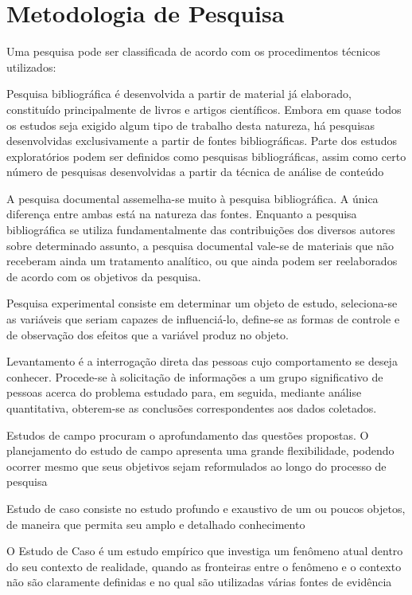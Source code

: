 \chapter[Metodologia de Pesquisa]{Metodologia de Pesquisa}

Uma pesquisa pode ser classificada de acordo com os procedimentos técnicos utilizados:

Pesquisa bibliográfica é desenvolvida a partir de material já elaborado,
constituído principalmente de livros e artigos científicos. Embora em quase todos
os estudos seja exigido algum tipo de trabalho desta natureza, há pesquisas desenvolvidas
exclusivamente a partir de fontes bibliográficas. Parte dos estudos exploratórios
podem ser definidos como pesquisas bibliográficas, assim como certo
número de pesquisas desenvolvidas a partir da técnica de análise de conteúdo \cite{gil}

A pesquisa documental assemelha-se muito à pesquisa bibliográfica. A única
diferença entre ambas está na natureza das fontes. Enquanto a pesquisa bibliográfica
se utiliza fundamentalmente das contribuições dos diversos autores sobre
determinado assunto, a pesquisa documental vale-se de materiais que não receberam
ainda um tratamento analítico, ou que ainda podem ser reelaborados de
acordo com os objetivos da pesquisa.  \cite{gil}

Pesquisa experimental consiste em determinar um
objeto de estudo, seleciona-se as variáveis que seriam
capazes de influenciá-lo, define-se as formas de
controle e de observação dos efeitos que a variável
produz no objeto. \cite{gil}

Levantamento é a interrogação direta das pessoas
cujo comportamento se deseja conhecer. Procede-se à
solicitação de informações a um grupo significativo de
pessoas acerca do problema estudado para, em seguida,
mediante análise quantitativa, obterem-se as conclusões
correspondentes aos dados coletados. \cite{gil}

Estudos de
campo procuram o aprofundamento das questões propostas. O planejamento do
estudo de campo apresenta uma grande flexibilidade, podendo ocorrer mesmo que seus objetivos sejam reformulados ao
longo do processo de pesquisa \cite{gil}

Estudo de caso consiste no estudo profundo e
exaustivo de um ou poucos objetos, de maneira
que permita seu amplo e detalhado
conhecimento \cite{gil}

O Estudo de Caso é um estudo empírico que
investiga um fenômeno atual dentro do seu contexto de realidade, quando as
fronteiras entre o fenômeno e o contexto não são claramente definidas e no qual
são utilizadas várias fontes de evidência \cite{yin}

